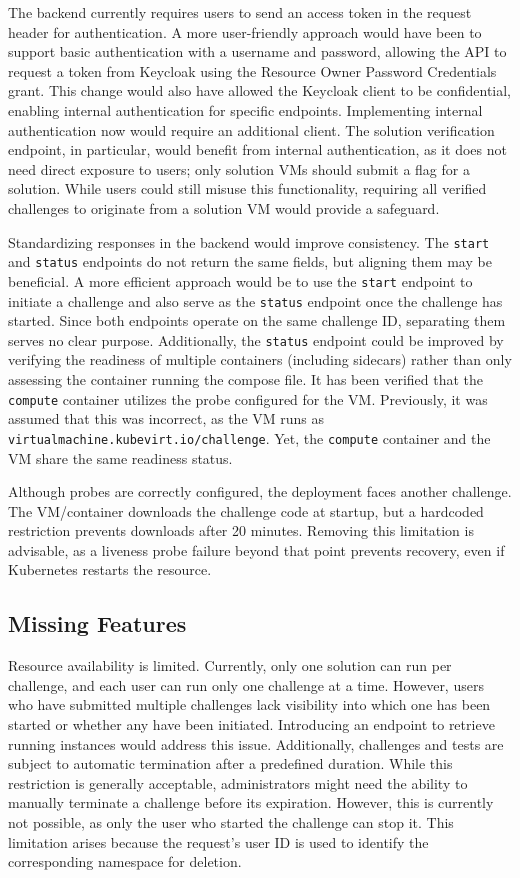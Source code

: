 The backend currently requires users to send an access token in the request header for authentication. A more user-friendly approach would have been to support basic authentication with a username and password, allowing the API to request a token from Keycloak using the Resource Owner Password Credentials grant. This change would also have allowed the Keycloak client to be confidential, enabling internal authentication for specific endpoints. Implementing internal authentication now would require an additional client. The solution verification endpoint, in particular, would benefit from internal authentication, as it does not need direct exposure to users; only solution VMs should submit a flag for a solution. While users could still misuse this 
functionality, requiring all verified challenges to originate from a solution VM would provide a safeguard.

Standardizing responses in the backend would improve consistency. The \texttt{start} and \texttt{status} endpoints do not return the same fields, but aligning them may be beneficial. A more efficient approach would be to use the \texttt{start} endpoint to initiate a challenge and also serve as the \texttt{status} endpoint once the challenge has started. Since both endpoints operate on the same challenge ID, separating them serves no clear purpose. Additionally, the \texttt{status} endpoint could be improved by verifying the readiness of multiple containers (including sidecars) rather than only assessing the container running the compose file. It has been verified that the \texttt{compute} container utilizes the probe configured for the VM. Previously, it was assumed that this was incorrect, as the VM runs as \texttt{virtualmachine.kubevirt.io/challenge}. Yet, the \texttt{compute} container and the VM share the same readiness status.

Although probes are correctly configured, the deployment faces another challenge. The VM/container downloads the challenge code at startup, but a hardcoded restriction prevents downloads after 20 minutes. Removing this limitation is advisable, as a liveness probe failure beyond that point prevents recovery, even if Kubernetes restarts the resource.

\subsection{Missing Features}
Resource availability is limited. Currently, only one solution can run per challenge, and each user can run only one challenge at a time. However, users who have submitted multiple challenges lack visibility into which one has been started or whether any have been initiated. Introducing an endpoint to retrieve running instances would address this issue. Additionally, challenges and tests are subject to automatic termination after a predefined duration. While this restriction is generally acceptable, administrators might need the ability to manually terminate a challenge before its expiration. However, this is currently not possible, as only the user who started the challenge can stop it. This limitation arises because the request's user ID is used to identify the corresponding namespace for deletion.

